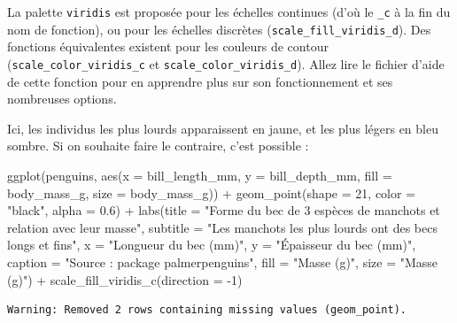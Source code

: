 \documentclass[
  letterpaper,
  DIV=11,
  numbers=noendperiod]{scrreprt}
\newenvironment{Shaded}{\begin{snugshade}}{\end{snugshade}}
\newcommand{\AttributeTok}[1]{\textcolor[rgb]{0.40,0.45,0.13}{#1}}
\newcommand{\DecValTok}[1]{\textcolor[rgb]{0.68,0.00,0.00}{#1}}
\newcommand{\FloatTok}[1]{\textcolor[rgb]{0.68,0.00,0.00}{#1}}
\newcommand{\FunctionTok}[1]{\textcolor[rgb]{0.28,0.35,0.67}{#1}}
\newcommand{\NormalTok}[1]{\textcolor[rgb]{0.00,0.23,0.31}{#1}}
\newcommand{\SpecialCharTok}[1]{\textcolor[rgb]{0.37,0.37,0.37}{#1}}
\newcommand{\StringTok}[1]{\textcolor[rgb]{0.13,0.47,0.30}{#1}}
\begin{document}
La palette \texttt{viridis} est proposée pour les échelles continues
(d'où le \texttt{\_c} à la fin du nom de fonction), ou pour les échelles
discrètes (\texttt{scale\_fill\_viridis\_d}). Des fonctions équivalentes
existent pour les couleurs de contour (\texttt{scale\_color\_viridis\_c}
et \texttt{scale\_color\_viridis\_d}). Allez lire le fichier d'aide de
cette fonction pour en apprendre plus sur son fonctionnement et ses
nombreuses options.

Ici, les individus les plus lourds apparaissent en jaune, et les plus
légers en bleu sombre. Si on souhaite faire le contraire, c'est possible
:

\begin{Shaded}
\begin{Highlighting}[]
\FunctionTok{ggplot}\NormalTok{(penguins, }\FunctionTok{aes}\NormalTok{(}\AttributeTok{x =}\NormalTok{ bill\_length\_mm, }\AttributeTok{y =}\NormalTok{ bill\_depth\_mm,}
                     \AttributeTok{fill =}\NormalTok{ body\_mass\_g, }\AttributeTok{size =}\NormalTok{ body\_mass\_g)) }\SpecialCharTok{+}
  \FunctionTok{geom\_point}\NormalTok{(}\AttributeTok{shape =} \DecValTok{21}\NormalTok{, }\AttributeTok{color =} \StringTok{"black"}\NormalTok{, }\AttributeTok{alpha =} \FloatTok{0.6}\NormalTok{) }\SpecialCharTok{+}
  \FunctionTok{labs}\NormalTok{(}\AttributeTok{title =} \StringTok{"Forme du bec de 3 espèces de manchots et relation avec leur masse"}\NormalTok{,}
       \AttributeTok{subtitle =} \StringTok{"Les manchots les plus lourds ont des becs longs et fins"}\NormalTok{,}
       \AttributeTok{x =} \StringTok{"Longueur du bec (mm)"}\NormalTok{,}
       \AttributeTok{y =} \StringTok{"Épaisseur du bec (mm)"}\NormalTok{,}
       \AttributeTok{caption =} \StringTok{"Source :  package \textquotesingle{}palmerpenguins\textquotesingle{}"}\NormalTok{,}
       \AttributeTok{fill =} \StringTok{"Masse (g)"}\NormalTok{,}
       \AttributeTok{size =} \StringTok{"Masse (g)"}\NormalTok{) }\SpecialCharTok{+}
  \FunctionTok{scale\_fill\_viridis\_c}\NormalTok{(}\AttributeTok{direction =} \SpecialCharTok{{-}}\DecValTok{1}\NormalTok{)}
\end{Highlighting}
\end{Shaded}

\begin{verbatim}
Warning: Removed 2 rows containing missing values (geom_point).
\end{verbatim}
\end{document}
